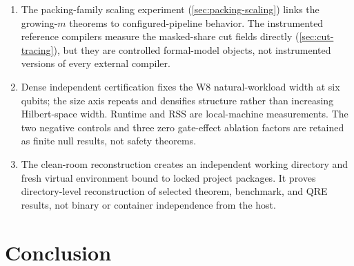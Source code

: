 \documentclass[aps,prx,reprint,floatfix,superscriptaddress]{revtex4-2}
\begin{document}
\begin{enumerate}[leftmargin=1.5em]
    family.  Absolute physical counts still require cross-validation under an
    independent estimator and architecture-specific routing/factory layouts.
    \item The packing-family scaling experiment
    (\cref{sec:packing-scaling}) links the growing-$m$ theorems to
    configured-pipeline behavior.  The instrumented reference compilers measure
    the masked-share cut fields directly (\cref{sec:cut-tracing}), but they are
    controlled formal-model objects, not instrumented versions of every
    external compiler.
    \item Dense independent certification fixes the W8 natural-workload width
    at six qubits; the size axis repeats and densifies structure rather than
    increasing Hilbert-space width.  Runtime and RSS are local-machine
    measurements.  The two negative controls and three zero gate-effect
    ablation factors are retained as finite null results, not safety theorems.
    \item The clean-room reconstruction creates an independent working
    directory and fresh virtual environment bound to locked project packages.
    It proves directory-level reconstruction of selected theorem, benchmark,
    and QRE results, not binary or container independence from the host.
\end{enumerate}


\section{Conclusion}
\label{sec:conclusion}
\end{document}
